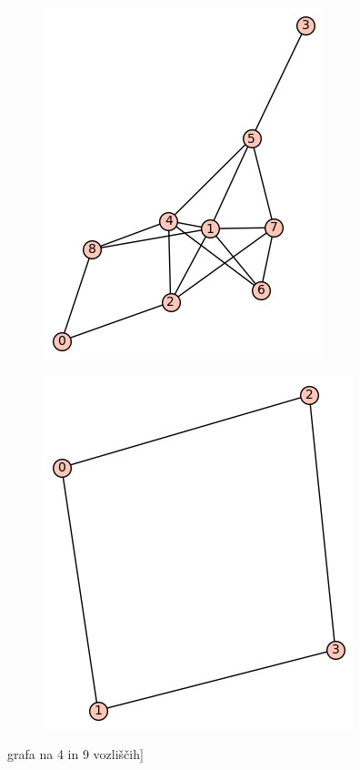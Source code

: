 \documentclass[12pt, a4paper]{article}
\begin{document}
\begin{center}
\begin{figure}[!htb]
\centering
\begin{subfigure}{0.5\textwidth}
  \centering
  \includegraphics[width=0.4\linewidth]{3,9,4,koncna1}
\end{subfigure}%
\begin{subfigure}{0.5\textwidth}
  \centering
  \includegraphics[width=0.5\linewidth]{3,9,4,koncna2}
\end{subfigure}
\caption{grafa na 4 in 9 vozliščih]}
\label{fig:test}
\end{figure}
\end{center}
\end{document}
